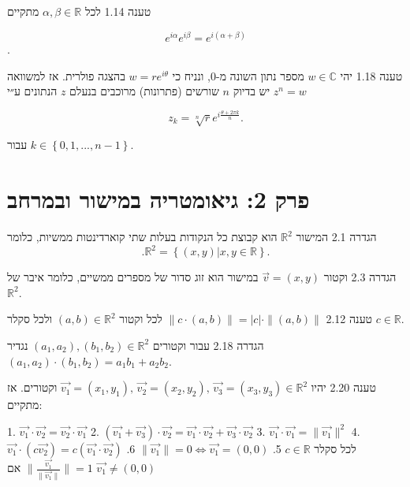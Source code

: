 \documentclass[a4paper, 11pt]{article}
\newcommand{\Set}[1]{\left\{#1\right\}}
\begin{document}
\begin{envbox}[thmcolor]{טענה 1.14}
לכל $\alpha,\beta\in\mathbb{R}$ מתקיים

\[
e^{i\alpha}e^{i\beta}=e^{i(\alpha+\beta)}
\]
.
\end{envbox}

\begin{envbox}[thmcolor]{טענה 1.18}
יהי $w\in\mathbb{C}$ מספר נתון השונה מ-$0$, ונניח כי $w=re^{i\theta}$ בהצגה פולרית. אז למשוואה $z^{n}=w$ יש בדיוק $n$ שורשים (פתרונות) מרוכבים בנעלם $z$ הנתונים ע״י

\[
z_{k}=\sqrt[n]{r}e^{i\frac{\theta+2\pi k}{n}}.
\]

עבור $k\in\Set{0,1,...,n-1}$.
\end{envbox}

\newpage

\section{פרק 2: גיאומטריה במישור ובמרחב}

\begin{envbox}[defcolor]{הגדרה 2.1}
המישור $\mathbb{R}^2$ הוא קבוצת כל הנקודות בעלות שתי קוארדינטות ממשיות, כלומר 
\[
.\mathbb{R}^2=\Set{(x,y)|x,y\in\mathbb{R}}.
\]
\end{envbox}

\begin{envbox}[defcolor]{הגדרה 2.3}
וקטור $\vec{v}=(x,y)$ במישור הוא זוג סדור של מספרים ממשיים, כלומר איבר של $\mathbb{R}^2$.
\end{envbox}

\begin{envbox}[thmcolor]{טענה 2.12}
$\|c\cdot(a,b)\| = |c|\cdot\|(a,b)\|$ לכל וקטור $(a,b)\in\mathbb{R}^2$ ולכל סקלר $c\in\mathbb{R}$.
\end{envbox}

\begin{envbox}[defcolor]{הגדרה 2.18}
עבור וקטורים $(a_1,a_2),(b_1,b_2)\in\mathbb{R}^2$ נגדיר  
$(a_1,a_2)\cdot(b_1,b_2)=a_1b_1+a_2b_2$.
\end{envbox}

\begin{envbox}[thmcolor]{טענה 2.20}
יהיו $\vec{v_1}=(x_1,y_1),\,\vec{v_2}=(x_2,y_2),\,\vec{v_3}=(x_3,y_3)\in\mathbb{R}^2$ וקטורים. אז מתקיים:

1. $\vec{v_1}\cdot\vec{v_2}=\vec{v_2}\cdot\vec{v_1}$  
2. $(\vec{v_1}+\vec{v_3})\cdot\vec{v_2}=\vec{v_1}\cdot\vec{v_2}+\vec{v_3}\cdot\vec{v_2}$  
3. $\vec{v_1}\cdot\vec{v_1}=\|\vec{v_1}\|^2$  
4. $\vec{v_1}\cdot(c\vec{v_2})=c(\vec{v_1}\cdot\vec{v_2})$ לכל סקלר $c\in\mathbb{R}$  
5. $\|\vec{v_1}\|=0\iff\vec{v_1}=(0,0)$  
6. $\|\frac{\vec{v_1}}{\|\vec{v_1}\|}\|=1$ אם $\vec{v_1}\neq(0,0)$
\end{envbox}
\end{document}
